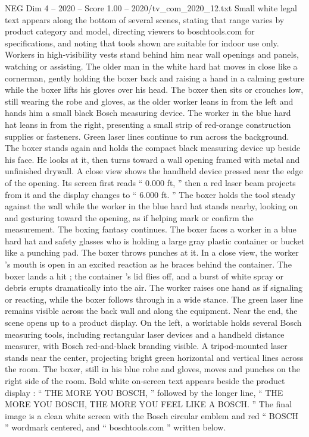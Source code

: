 \begin{textsample}{NEG Dim 4 – 2020 – Score 1.00 – 2020/tv\_com\_2020\_12.txt}
Small white legal text appears along the bottom of several scenes, stating that range varies by product category and model, directing viewers to boschtools.com for specifications, and noting that tools shown are suitable for indoor use only.
Workers in high-visibility vests stand behind him near wall openings and panels, watching or assisting.
The older man in the white hard hat moves in close like a cornerman, gently holding the boxer back and raising a hand in a calming gesture while the boxer lifts his gloves over his head.
The boxer then sits or crouches low, still wearing the robe and gloves, as the older worker leans in from the left and hands him a small black Bosch measuring device.
The worker in the blue hard hat leans in from the right, presenting a small strip of red-orange construction supplies or fasteners.
Green laser lines continue to run across the background.
The boxer stands again and holds the compact black measuring device up beside his face.
He looks at it, then turns toward a wall opening framed with metal and unfinished drywall.
A close view shows the handheld device pressed near the edge of the opening.
Its screen first reads “ 0.000 ft, ” then a red laser beam projects from it and the display changes to “ 6.000 ft. ” The boxer holds the tool steady against the wall while the worker in the blue hard hat stands nearby, looking on and gesturing toward the opening, as if helping mark or confirm the measurement.
The boxing fantasy continues.
The boxer faces a worker in a blue hard hat and safety glasses who is holding a large gray plastic container or bucket like a punching pad.
The boxer throws punches at it.
In a close view, the worker ’s mouth is open in an excited reaction as he braces behind the container.
The boxer lands a hit ; the container ’s lid flies off, and a burst of white spray or debris erupts dramatically into the air.
The worker raises one hand as if signaling or reacting, while the boxer follows through in a wide stance.
The green laser line remains visible across the back wall and along the equipment.
Near the end, the scene opens up to a product display.
On the left, a worktable holds several Bosch measuring tools, including rectangular laser devices and a handheld distance measurer, with Bosch red-and-black branding visible.
A tripod-mounted laser stands near the center, projecting bright green horizontal and vertical lines across the room.
The boxer, still in his blue robe and gloves, moves and punches on the right side of the room.
Bold white on-screen text appears beside the product display : “ THE MORE YOU BOSCH, ” followed by the longer line, “ THE MORE YOU BOSCH, THE MORE YOU FEEL LIKE A BOSCH. ” The final image is a clean white screen with the Bosch circular emblem and red “ BOSCH ” wordmark centered, and “ boschtools.com ” written below.

\end{textsample}
